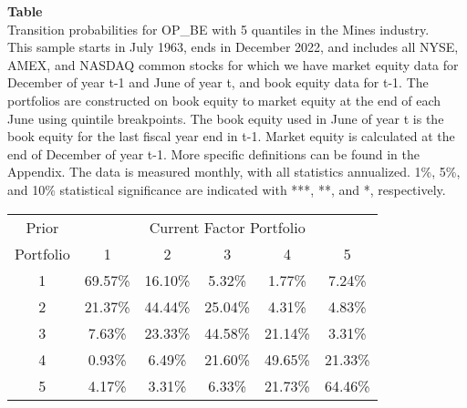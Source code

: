 \begin{table*}[ht!]
\raggedright
{}
\label{tab: transition_probs_OP_BE_Mines_with_5_quantiles}
\textbf{Table \thetable} \\
Transition probabilities for OP_BE with 5 quantiles in the Mines industry. \\
\hspace*{1em}This sample starts in July 1963, ends in December 2022, and includes all NYSE, AMEX, and NASDAQ common stocks for which we have market equity data for December of year t-1 and June of year t, and book equity data for t-1. The portfolios are constructed on book equity to market equity at the end of each June using quintile breakpoints.  The book equity used in June of year t is the book equity for the last fiscal year end in t-1.  Market equity is calculated at the end of December of year t-1.  More specific definitions can be found in the Appendix.  The data is measured monthly, with all statistics annualized.  1\%, 5\%, and 10\% statistical significance are indicated with ***, **, and *, respectively. \\
\vspace{0.5em}
\centering
\begin{adjustbox}{max width=\textwidth}
\begin{tabular}{@{}cccccc@{}}
\toprule
Prior & \multicolumn{5}{c}{Current Factor Portfolio} \\
Portfolio & 1 & 2 & 3 & 4 & 5 \\
\midrule
1 & 69.57\% & 16.10\% & 5.32\% & 1.77\% & 7.24\% \\
2 & 21.37\% & 44.44\% & 25.04\% & 4.31\% & 4.83\% \\
3 & 7.63\% & 23.33\% & 44.58\% & 21.14\% & 3.31\% \\
4 & 0.93\% & 6.49\% & 21.60\% & 49.65\% & 21.33\% \\
5 & 4.17\% & 3.31\% & 6.33\% & 21.73\% & 64.46\% \\
\bottomrule
\end{tabular}
\end{adjustbox}
\end{table*}